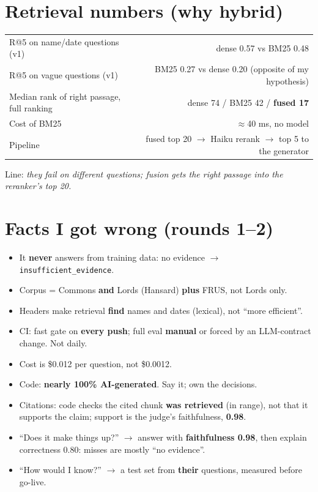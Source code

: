 \documentclass[10pt,a4paper]{article}
\begin{document}
\section{Retrieval numbers (why hybrid)}
\small
\begin{tabularx}{\linewidth}{@{}Xr@{}}
\toprule
R@5 on name/date questions (v1) & dense 0.57 vs BM25 0.48 \\
R@5 on vague questions (v1) & BM25 0.27 vs dense 0.20 (opposite of my hypothesis) \\
Median rank of right passage, full ranking & dense 74 / BM25 42 / \textbf{fused 17} \\
Cost of BM25 & $\approx$40 ms, no model \\
Pipeline & fused top 20 $\to$ Haiku rerank $\to$ top 5 to the generator \\
\bottomrule
\end{tabularx}
\normalsize
Line: \emph{they fail on different questions; fusion gets the right passage into the reranker's top 20.}

\section{Facts I got wrong (rounds 1--2)}
\begin{itemize}
\item It \textbf{never} answers from training data: no evidence $\to$ \texttt{insufficient\_evidence}.
\item Corpus = Commons \textbf{and} Lords (Hansard) \textbf{plus} FRUS, not Lords only.
\item Headers make retrieval \textbf{find} names and dates (lexical), not ``more efficient''.
\item CI: fast gate on \textbf{every push}; full eval \textbf{manual} or forced by an LLM-contract change. Not daily.
\item Cost is \$0.012 per question, not \$0.0012.
\item Code: \textbf{nearly 100\% AI-generated}. Say it; own the decisions.
\item Citations: code checks the cited chunk \textbf{was retrieved} (in range), not that it supports the claim; support is the judge's faithfulness, \textbf{0.98}.
\item ``Does it make things up?'' $\to$ answer with \textbf{faithfulness 0.98}, then explain correctness 0.80: misses are mostly ``no evidence''.
\item ``How would I know?'' $\to$ a test set from \textbf{their} questions, measured before go-live.
\end{itemize}
\end{document}

